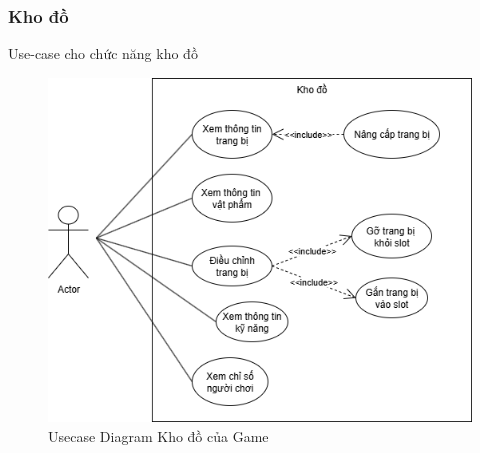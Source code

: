 \subsubsection{Kho đồ}
Use-case cho chức năng kho đồ
\begin{figure}[H]
	\centering
	\includegraphics[width=14cm]{Images/InventoryUCD.png}
	\vspace{0.5cm}
	\caption{Usecase Diagram Kho đồ của Game}
\end{figure}
